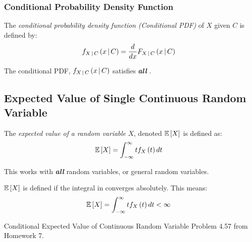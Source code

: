 		\subsubsection{Conditional Probability Density Function} \label{subsubsec:Conditional Probability Density Function}
			\begin{definition} \label{def:Conditional Probability Density Function}
				The \emph{conditional probability density function (Conditional PDF)} of $X$ given $C$ is defined by:
				\begin{equation} \label{eq:Conditional Probability Density Function}
					f_{X \operatorname{\vert} C} \left( x \operatorname{\vert} C \right) = \frac{d}{dx} F_{X \operatorname{\vert} C} \left( x \operatorname{\vert} C \right)
				\end{equation}
				\begin{remark}
					The conditional PDF, $f_{X \operatorname{\vert} C} \left( x \operatorname{\vert} C \right)$ satisfies \emph{\textbf{all}} .
				\end{remark}
			\end{definition}
	
	\subsection{Expected Value of Single Continuous Random Variable} \label{subsec:Expected Value of Single Continuous}
		\begin{definition} \label{def:Expected Value of Single Continuous}
			The \emph{expected value of a random variable} $X$, denoted $\operatorname{\operatorname{\mathbb{E}}} \left[ X \right]$ is defined as:
			\begin{equation} \label{eq:Expected Value of Single Continuous}
				\operatorname{\operatorname{\mathbb{E}}} \left[ X \right] = \int_{-\infty}^{\infty} t f_{X} \left( t \right) dt
			\end{equation}
			\begin{remark}
				This works with \emph{\textbf{all}} random variables, or general random variables.
			\end{remark}
			\begin{remark}
				$\operatorname{\operatorname{\mathbb{E}}} \left[ X \right]$ is defined if the integral in  converges absolutely.
				This means:
				\begin{equation*}
					\operatorname{\operatorname{\mathbb{E}}} \left[ X \right] = \int_{-\infty}^{\infty} t f_{X} \left( t \right) dt < \infty
				\end{equation*}
			\end{remark}
		\end{definition}
		\begin{example}[Problem 4.57]{Conditional Expected Value of Continuous Random Variable}
			Problem 4.57 from Homework 7.
		\end{example}
	
